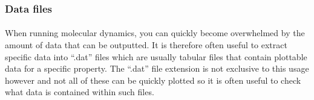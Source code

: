     \subsubsection{Data files}
    \paragraph{}
        When running molecular dynamics, you can quickly become overwhelmed by the amount of data that can be outputted. It is therefore often useful to extract specific data into \enquote{.dat} files which are usually tabular files that contain plottable data for a specific property. The \enquote{.dat} file extension is not exclusive to this usage however and not all of these can be quickly plotted so it is often useful to check what data is contained within such files. 